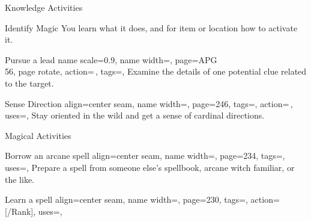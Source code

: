 \begin{PageFrontLandscape}
\begin{TablesHalf}{\frontTableHeight}
\begin{Table}{Knowledge Activities}
\begin{entry}{Identify Magic}
                You learn what it does, and for item or location how to activate it. \hfill
                \quad\;\,
            \end{entry}
            \breakLine
            \begin{entry}{Pursue a lead}{%
                name scale=0.9,
                name width=\activityLength,%
                page={APG\\\vspace{-0.4ex}56},
                page rotate,
                action=\,,
                tags=\Concentrate\Investigator,
            }
                Examine the details of one potential clue related to the target.
            \end{entry}
            \begin{entry}{Sense Direction}{%
                align=center seam,
                name width=\activityLength,%
                page=246,
                tags=\Concentrate,
                action=\,,
                uses={\Survival[tags=S]},
            }
                Stay oriented in the wild and get a sense of cardinal directions. \hfill
                \\
                \hfill{}
            \end{entry}
        \end{Table}
        \TableSpace
        \begin{Table}{Magical Activities}
            \begin{entry}{Borrow an arcane spell}{%
                align=center seam,
                name width=\activityLength,%
                page=234,
                tags=\Concentrate,
                uses={\Arcana[tags=T]},
            }
                Prepare a spell from someone else's spellbook, arcane witch familiar, or the like. \\
                 \hfill
            \end{entry}
            \begin{entry}{Learn a spell}{%
                align=center seam,
                name width=\activityLength,%
                page=230,
                tags=\Concentrate,
                action=\,[/Rank],
                uses={\MagicalSkill[tags=T]},
}
\end{entry}
\end{Table}
\end{TablesHalf}
\end{PageFrontLandscape}
